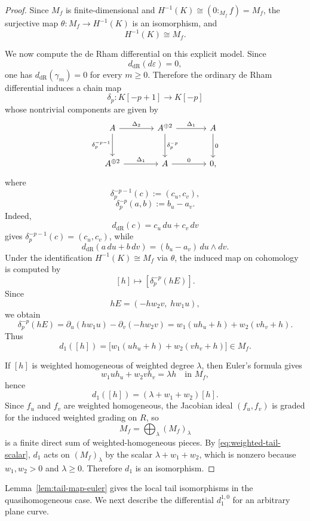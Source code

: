 \documentclass[12pt,reqno]{amsart}
\begin{document}
\begin{proof}
Since \(M_f\) is finite-dimensional and \(H^{-1}(K)\cong (0:_{M_f}f)=M_f\), the surjective map \(\theta:M_f\to H^{-1}(K)\) is an isomorphism, and
\[
H^{-1}(K)\cong M_f.
\]

We now compute the de Rham differential on this explicit model. Since
\[
d_{\mathrm{dR}}(d\varepsilon)=0,
\]
one has \(d_{\mathrm{dR}}(\gamma_m)=0\) for every \(m\ge 0\). Therefore the ordinary de Rham differential induces a chain map
\[
\delta_p:K[-p+1]\longrightarrow K[-p]
\]
whose nontrivial components are given by
\[
\begin{tikzcd}[column sep=large, row sep=large]
A
  \arrow[r, "\Delta_2"]
  \arrow[d, "\delta_p^{-p-1}" left]
&
A^{\oplus 2}
  \arrow[r, "\Delta_1"]
  \arrow[d, "\delta_p^{-p}"]
&
A
  \arrow[d, "0"]
\\
A^{\oplus 2}
  \arrow[r, "\Delta_1"]
&
A
  \arrow[r, "0"]
&
0,
\end{tikzcd}
\]
where
\[
\delta_p^{-p-1}(c):=(c_u,c_v),
\]
\[
\delta_p^{-p}(a,b):=b_u-a_v.
\]
Indeed,
\[
d_{\mathrm{dR}}(c)=c_u\,du+c_v\,dv
\]
gives \(\delta_p^{-p-1}(c)=(c_u,c_v)\), while
\[
d_{\mathrm{dR}}(a\,du+b\,dv)=(b_u-a_v)\,du\wedge dv.
\]
Under the identification \(H^{-1}(K)\cong M_f\) via \(\theta\), the induced map on cohomology is computed by
\[
[h]\longmapsto [\delta_p^{-p}(hE)].
\]
Since
\[
hE=(-h w_2v,\; h w_1u),
\]
we obtain
\[
\delta_p^{-p}(hE)=\partial_u(hw_1u)-\partial_v(-hw_2v)
=
w_1(uh_u+h)+w_2(vh_v+h).
\]
Thus
\[
d_1([h])
=
\bigl[w_1(uh_u+h)+w_2(vh_v+h)\bigr]
\in M_f.
\]

If $[h]$ is weighted homogeneous of weighted degree $\lambda$, then Euler's formula gives
\[
w_1uh_u+w_2vh_v=\lambda h
\quad\text{in }M_f,
\]
hence
\begin{equation}\label{eq:weighted-tail-scalar}
d_1([h])=(\lambda+w_1+w_2)[h].
\end{equation}
Since $f_u$ and $f_v$ are weighted homogeneous, the Jacobian ideal $(f_u,f_v)$ is graded for the induced weighted grading on $R$, so
\[
M_f=\bigoplus_{\lambda}(M_f)_\lambda
\]
is a finite direct sum of weighted-homogeneous pieces. By \eqref{eq:weighted-tail-scalar}, $d_1$ acts on $(M_f)_\lambda$ by the scalar \(\lambda+w_1+w_2\), which is nonzero because \(w_1,w_2>0\) and \(\lambda\ge 0\). Therefore $d_1$ is an isomorphism.
\end{proof}
  
Lemma~\ref{lem:tail-map-euler} gives the local tail isomorphisms in the quasihomogeneous case. We next describe the differential \(d_1^{1,0}\) for an arbitrary plane curve.
\end{document}
